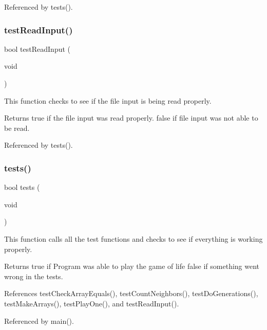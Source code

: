 Referenced by tests().

\mbox{\label{tests_8c_aa89f64db87aebe77bd891e2894595e4e}} 
\subsubsection{test\+Read\+Input()}
{\footnotesize\ttfamily bool test\+Read\+Input (\begin{DoxyParamCaption}\item[{void}]{ }\end{DoxyParamCaption})}

This function checks to see if the file input is being read properly. \begin{DoxyReturn}{Returns}
true if the file input was read properly. false if file input was not able to be read. 
\end{DoxyReturn}


Referenced by tests().

\mbox{\label{tests_8c_a5e6e6e78df62797046c9ea173550a68a}} 
\subsubsection{tests()}
{\footnotesize\ttfamily bool tests (\begin{DoxyParamCaption}\item[{void}]{ }\end{DoxyParamCaption})}

This function calls all the test functions and checks to see if everything is working properly. \begin{DoxyReturn}{Returns}
true if Program was able to play the game of life false if something went wrong in the tests. 
\end{DoxyReturn}


References test\+Check\+Array\+Equals(), test\+Count\+Neighbors(), test\+Do\+Generations(), test\+Make\+Arrays(), test\+Play\+One(), and test\+Read\+Input().



Referenced by main().

